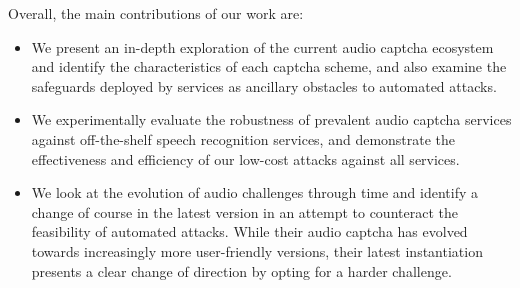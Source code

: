 Overall, the main contributions of our work are:

\begin{itemize}

\item We present an in-depth exploration of the current audio captcha ecosystem and identify the characteristics 
of each captcha scheme, and also examine the safeguards deployed by services as ancillary obstacles to automated
attacks.

\item We experimentally evaluate the robustness of prevalent audio captcha services against
off-the-shelf speech recognition services, and demonstrate the effectiveness and efficiency 
of our low-cost attacks against all services.

\item We look at the evolution of \re audio challenges through time
 and identify a change of course in the latest version %
 in an attempt to counteract the feasibility of automated attacks. While 
 their audio captcha has evolved towards increasingly more user-friendly versions,
 their latest instantiation presents a clear change of direction by 
 opting for a harder challenge.


\end{itemize}
